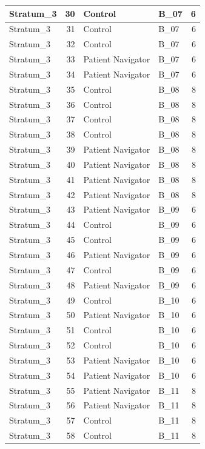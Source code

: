 \documentclass[
]{book}
\begin{document}
\begin{table}[H]
\begin{tabular}{l|r|l|l|r}
\hline
Stratum\_3 & 30 & Control & B\_07 & 6\\
\hline
Stratum\_3 & 31 & Control & B\_07 & 6\\
\hline
Stratum\_3 & 32 & Control & B\_07 & 6\\
\hline
Stratum\_3 & 33 & Patient Navigator & B\_07 & 6\\
\hline
Stratum\_3 & 34 & Patient Navigator & B\_07 & 6\\
\hline
Stratum\_3 & 35 & Control & B\_08 & 8\\
\hline
Stratum\_3 & 36 & Control & B\_08 & 8\\
\hline
Stratum\_3 & 37 & Control & B\_08 & 8\\
\hline
Stratum\_3 & 38 & Control & B\_08 & 8\\
\hline
Stratum\_3 & 39 & Patient Navigator & B\_08 & 8\\
\hline
Stratum\_3 & 40 & Patient Navigator & B\_08 & 8\\
\hline
Stratum\_3 & 41 & Patient Navigator & B\_08 & 8\\
\hline
Stratum\_3 & 42 & Patient Navigator & B\_08 & 8\\
\hline
Stratum\_3 & 43 & Patient Navigator & B\_09 & 6\\
\hline
Stratum\_3 & 44 & Control & B\_09 & 6\\
\hline
Stratum\_3 & 45 & Control & B\_09 & 6\\
\hline
Stratum\_3 & 46 & Patient Navigator & B\_09 & 6\\
\hline
Stratum\_3 & 47 & Control & B\_09 & 6\\
\hline
Stratum\_3 & 48 & Patient Navigator & B\_09 & 6\\
\hline
Stratum\_3 & 49 & Control & B\_10 & 6\\
\hline
Stratum\_3 & 50 & Patient Navigator & B\_10 & 6\\
\hline
Stratum\_3 & 51 & Control & B\_10 & 6\\
\hline
Stratum\_3 & 52 & Control & B\_10 & 6\\
\hline
Stratum\_3 & 53 & Patient Navigator & B\_10 & 6\\
\hline
Stratum\_3 & 54 & Patient Navigator & B\_10 & 6\\
\hline
Stratum\_3 & 55 & Patient Navigator & B\_11 & 8\\
\hline
Stratum\_3 & 56 & Patient Navigator & B\_11 & 8\\
\hline
Stratum\_3 & 57 & Control & B\_11 & 8\\
\hline
Stratum\_3 & 58 & Control & B\_11 & 8\\

\end{tabular}
\end{table}
\end{document}
